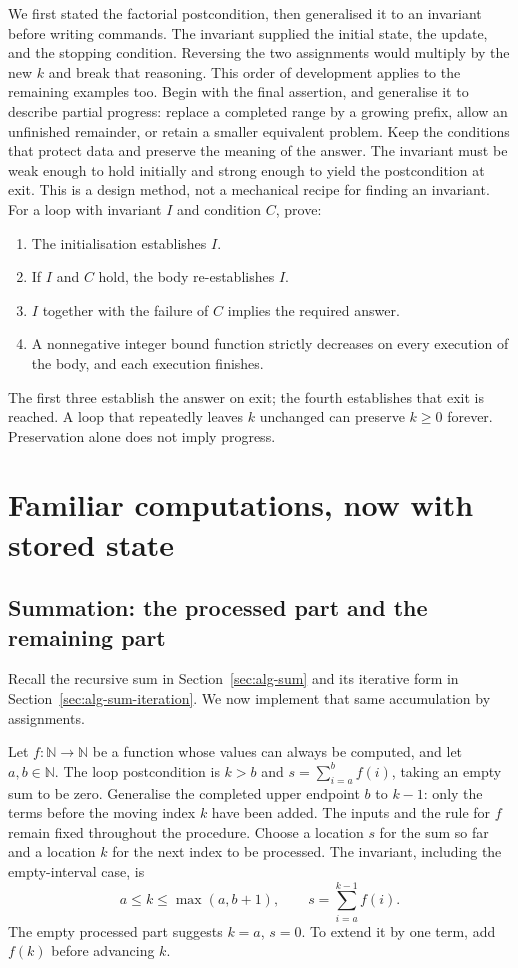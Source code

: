 We first stated the factorial postcondition, then generalised it to an
invariant before writing commands. The invariant supplied
the initial state, the update, and the stopping condition. Reversing the
two assignments would multiply by the new $k$ and break that reasoning.
This order of development applies to the remaining examples too.
Begin with the final assertion, and generalise it to describe partial
progress: replace a completed range by a growing prefix, allow an
unfinished remainder, or retain a smaller equivalent problem. Keep the
conditions that protect data and preserve the meaning of the answer.
The invariant must be weak enough to hold initially and strong enough to
yield the postcondition at exit. This is a design method, not a mechanical
recipe for finding an invariant.
For a loop with invariant $I$ and condition $C$, prove:
\begin{enumerate}
\item The initialisation establishes $I$.
\item If $I$ and $C$ hold, the body re-establishes $I$.
\item $I$ together with the failure of $C$ implies the required answer.
\item A nonnegative integer bound function strictly decreases on every
execution of the body, and each execution finishes.
\end{enumerate}
The first three establish the answer on exit; the fourth establishes that
exit is reached. A loop that repeatedly leaves $k$ unchanged can preserve
$k\geq0$ forever. Preservation alone does not imply progress.

\section{Familiar computations, now with stored state}

\subsection{Summation: the processed part and the remaining part}

Recall the recursive sum in Section~\ref{sec:alg-sum} and its iterative
form in Section~\ref{sec:alg-sum-iteration}. We now implement that same
accumulation by assignments.

Let $f:\mathbb N\to\mathbb N$ be a function whose values can always be computed, and let $a,b\in\mathbb N$.
The loop postcondition is $k>b$ and $s=\sum_{i=a}^{b}f(i)$,
taking an empty sum to be zero. Generalise the completed upper endpoint
$b$ to $k-1$: only the terms before the moving index $k$ have been added.
The inputs and the rule for $f$ remain fixed throughout the procedure.
Choose a location $s$ for the sum so far and a location $k$ for the next
index to be processed. The invariant, including the empty-interval case, is
\[
a\leq k\leq\max(a,b+1),\qquad s=\sum_{i=a}^{k-1}f(i).
\]
The empty processed part suggests $k=a$, $s=0$. To extend it by one term,
add $f(k)$ before advancing $k$.

